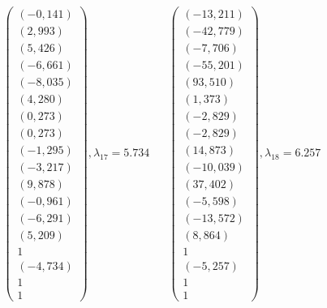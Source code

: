 \documentclass[a5paper, 10pt]{article}
\theoremstyle{definition}
\theoremstyle{plain}
\theoremstyle{remark}
\begin{document}
\begin{equation*}
\left(\begin{matrix}
\left(-0,141\right) \\
\left(2,993\right) \\
\left(5,426\right) \\
\left(-6,661\right) \\
\left(-8,035\right) \\
\left(4,280\right) \\
\left(0,273\right) \\
\left(0,273\right) \\
\left(-1,295\right) \\
\left(-3,217\right) \\
\left(9,878\right) \\
\left(-0,961\right) \\
\left(-6,291\right) \\
\left(5,209\right) \\
1 \\
\left(-4,734\right) \\
1 \\
1
\end{matrix}\right)
,  \lambda_ {17} = 5.734\,\,\,\,\,\,\,\,\,\,
\left(\begin{matrix}
\left(-13,211\right) \\
\left(-42,779\right) \\
\left(-7,706\right) \\
\left(-55,201\right) \\
\left(93,510\right) \\
\left(1,373\right) \\
\left(-2,829\right) \\
\left(-2,829\right) \\
\left(14,873\right) \\
\left(-10,039\right) \\
\left(37,402\right) \\
\left(-5,598\right) \\
\left(-13,572\right) \\
\left(8,864\right) \\
1 \\
\left(-5,257\right) \\
1 \\
1
\end{matrix}\right)
,  \lambda_ {18} = 6.257\,\,\,\,\,\,\,\,\,\,
\end{equation*}
\end{document}
